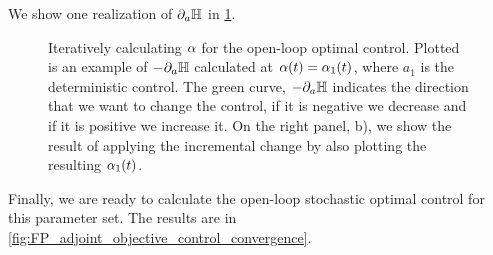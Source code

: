 \documentclass{article}
\begin{document}
We show one realization of ${\partial}_a { \mathbb{H}}$ in \cref{fig:grad_aH_deterministic_alpha}.
\begin{figure}[htp]
\begin{center}
\caption[labelInTOC]{Iteratively calculating ${\alpha}$ for the
open-loop optimal control. Plotted is an example of
$-{\partial}_a { \mathbb{H}}$ calculated at ${\alpha}(t) = {\alpha}_1(t)$, where $a_1$ is the deterministic control. The green curve, $-{\partial}_a { \mathbb{H}}$
indicates the direction that we want to change the control, if it is negative
we decrease and if it is positive we increase it. On the right panel, b), we
show the result of applying the incremental change by also plotting the
resulting ${\alpha}_1(t)$. }
\label{fig:grad_aH_deterministic_alpha}
\end{center}
\end{figure} 

Finally, we are ready to calculate the open-loop stochastic optimal control for
this parameter set. The results are in
\cref{fig:FP_adjoint_objective_control_convergence}.
\end{document}
